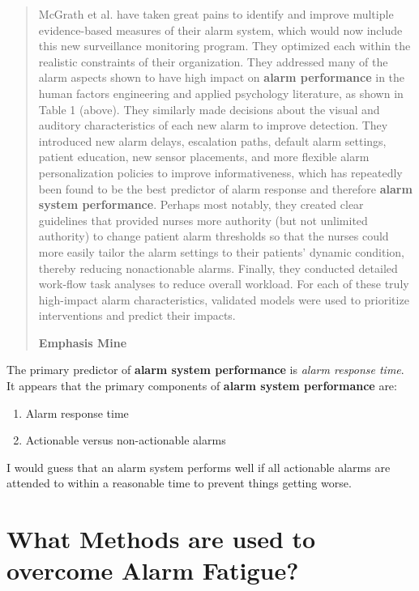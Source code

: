 \begin{quotation}
	McGrath et al. have taken great pains to identify and improve
	multiple evidence-based measures of their alarm system, which
	would now include this new surveillance monitoring program.
	They optimized each within the realistic constraints of their organization. They addressed many of the alarm aspects shown
	to have high impact on \textbf{alarm performance} in the human factors engineering and applied psychology literature, as shown in
	Table 1 (above). They similarly made decisions about the visual
	and auditory characteristics of each new alarm to improve detection. They introduced new alarm delays, escalation paths, default alarm settings, patient education, new sensor placements,
	and more flexible alarm personalization policies to improve informativeness, which has repeatedly been found to be the best predictor of alarm response and therefore \textbf{alarm system performance}. Perhaps most notably, they created clear guidelines
	that provided nurses more authority (but not unlimited authority) to change patient alarm thresholds so that the nurses could
	more easily tailor the alarm settings to their patients’ dynamic
	condition, thereby reducing nonactionable alarms. Finally, they
	conducted detailed work-flow task analyses to reduce overall
	workload. For each of these truly high-impact alarm characteristics, validated models were used to prioritize interventions and
	predict their impacts. \\
	\begin{flushright}
		\textbf{Emphasis Mine}
	\end{flushright}
\end{quotation}

The primary predictor of \textbf{alarm system performance} is \textit{alarm response time}. It appears that the primary components of \textbf{alarm system performance} are: \\

\begin{enumerate}
	\item Alarm response time
	\item Actionable versus non-actionable alarms
\end{enumerate}

I would guess that an alarm system performs well if all actionable alarms are attended to within a reasonable time to prevent things getting worse. \\

\section{What Methods are used to overcome Alarm Fatigue?}

